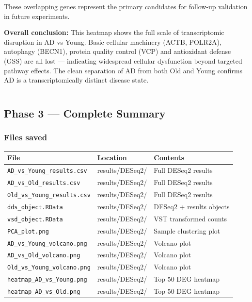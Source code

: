 \documentclass[
]{article}
\begin{document}
These overlapping genes represent the primary candidates for follow-up
validation in future experiments.

\textbf{Overall conclusion:} This heatmap shows the full scale of
transcriptomic disruption in AD vs Young. Basic cellular machinery
(ACTB, POLR2A), autophagy (BECN1), protein quality control (VCP) and
antioxidant defense (GSS) are all lost --- indicating widespread
cellular dysfunction beyond targeted pathway effects. The clean
separation of AD from both Old and Young confirms AD is a
transcriptomically distinct disease state.

\begin{center}\rule{0.5\linewidth}{0.5pt}\end{center}

\subsection{Phase 3 --- Complete
Summary}\label{phase-3-complete-summary}

\subsubsection{Files saved}\label{files-saved}

\begin{longtable}[]{@{}lll@{}}
\toprule\noalign{}
File & Location & Contents \\
\midrule\noalign{}
\endhead
\bottomrule\noalign{}
\endlastfoot
\texttt{AD\_vs\_Young\_results.csv} & results/DESeq2/ & Full DESeq2
results \\
\texttt{AD\_vs\_Old\_results.csv} & results/DESeq2/ & Full DESeq2
results \\
\texttt{Old\_vs\_Young\_results.csv} & results/DESeq2/ & Full DESeq2
results \\
\texttt{dds\_object.RData} & results/DESeq2/ & DESeq2 + results
objects \\
\texttt{vsd\_object.RData} & results/DESeq2/ & VST transformed counts \\
\texttt{PCA\_plot.png} & results/DESeq2/ & Sample clustering plot \\
\texttt{AD\_vs\_Young\_volcano.png} & results/DESeq2/ & Volcano plot \\
\texttt{AD\_vs\_Old\_volcano.png} & results/DESeq2/ & Volcano plot \\
\texttt{Old\_vs\_Young\_volcano.png} & results/DESeq2/ & Volcano plot \\
\texttt{heatmap\_AD\_vs\_Young.png} & results/DESeq2/ & Top 50 DEG
heatmap \\
\texttt{heatmap\_AD\_vs\_Old.png} & results/DESeq2/ & Top 50 DEG
heatmap \\
\end{longtable}
\end{document}
